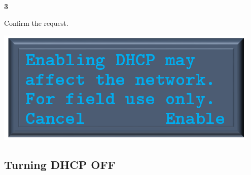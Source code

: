 \documentclass[11pt, oneside]{book}
\begin{document}
\\[\baselineskip]
\noindent\begin{minipage}{0.45\textwidth}%
\begin{center}
\textbf{3}\\[\baselineskip]
\end{center}
Confirm the request.
\end{minipage}%
\hfill%
\begin{minipage}{0.45\textwidth}
\includegraphics[width=\linewidth]{../media/pstricks_files/08_dhcp_warning}
\end{minipage}
\subsection{Turning DHCP OFF}\label{subsec:disable_dhcp}
\end{document}
